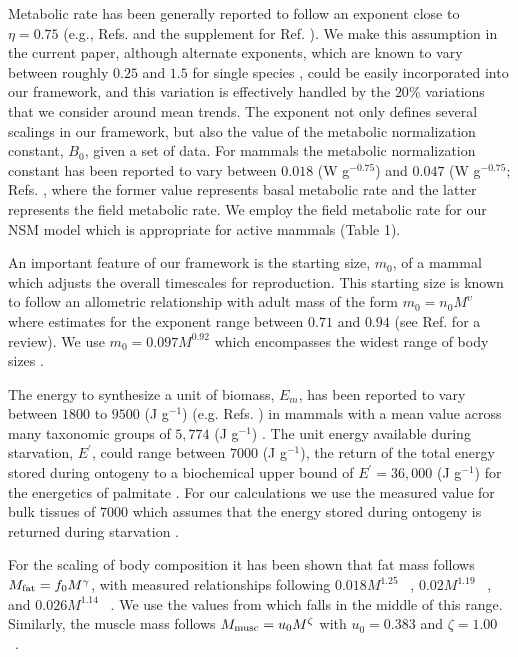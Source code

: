 \documentclass[twocolumn,preprintnumbers,amsmath,amssymb,superscriptaddress]{revtex4}
\begin{document}
\begin{bibunit}[unsrt]
Metabolic rate has been generally reported to follow an exponent close to $\eta=0.75$ (e.g., Refs. \citep{West:2001bv,moses2008rmo} and the supplement for Ref. \citep{hou}). We make this assumption in the current paper, although alternate exponents, which are known to vary between roughly $0.25$ and $1.5$ for single species \citep{moses2008rmo}, could be easily incorporated into our framework, and this variation is effectively handled by the $20\%$ variations that we consider around mean trends. The exponent not only defines several scalings in our framework, but also the value of the metabolic normalization constant, $B_{0}$, given a set of data.  For mammals the metabolic normalization constant has been reported to vary between $0.018$ (W g$^{-0.75}$) and $0.047$ (W g$^{-0.75}$; Refs. \citep{hou,West:2001bv}, where the former value represents basal metabolic rate and the latter represents the field metabolic rate. We employ the field metabolic rate for our NSM model which is appropriate for active mammals (Table 1).

An important feature of our framework is the starting size, $m_{0}$, of a mammal which adjusts the overall timescales for reproduction. This starting size is known to follow an allometric relationship with adult mass of the form $m_{0}=n_{0}M^{\upsilon}$ where estimates for the exponent range between $0.71$ and $0.94$ (see Ref. \citep{peters1986ecological} for a review). We use $m_{0}=0.097M^{0.92}$ \citep{blueweiss1978relationships} which encompasses the widest range of body sizes \citep{peters1986ecological}.

The energy to synthesize a unit of biomass, $E_{m}$, has been reported to vary between $1800$ to $9500$ (J g$^{-1}$) (e.g. Refs. \citep{West:2001bv,moses2008rmo,hou}) in mammals with a mean value across many taxonomic groups of $5,774$ (J g$^{-1}$) \citep{moses2008rmo}. The unit energy available during starvation, $E^{\prime}$, could range between $7000$ (J g$^{-1}$), the return of the total energy stored during ontogeny \citep{hou} to a biochemical upper bound of $E^{\prime}=36,000$ (J g$^{-1}$) for the energetics of palmitate \citep{stryer,hou}. For our calculations we use the measured value for bulk tissues of $7000$ which assumes that the energy stored during ontogeny is returned during starvation \citep{hou}.

For the scaling of body composition it has been shown that fat mass follows $M_{\rm fat}=f_{0}M^{\gamma}$, with measured  relationships following  $0.018M^{1.25}$ ~\citep{Dunbrack:1993ec}, $0.02M^{1.19}$ ~\citep{Lindstedt:1985hm}, and $0.026M^{1.14}$ ~\citep{Lindstedt:2002td}. We use the values from \citep{Lindstedt:1985hm} which falls in the middle of this range. Similarly, the muscle mass follows $M_{\rm musc}=u_{0}M^{\zeta}$ with $u_{0}=0.383$ and $\zeta=1.00$ ~\citep{Lindstedt:2002td}.


\end{bibunit}
\end{document}
